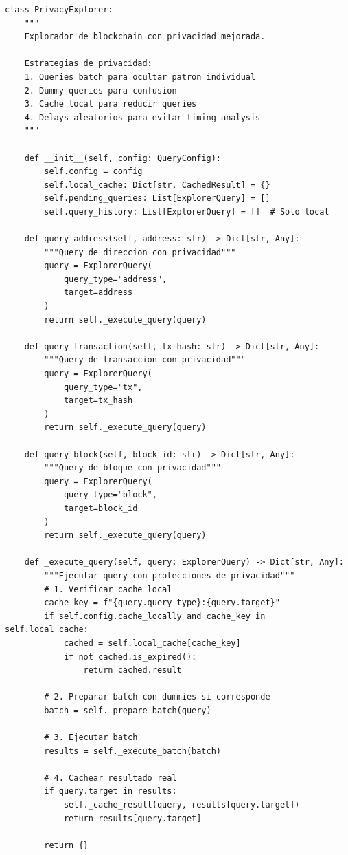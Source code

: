 \documentclass[11pt,a4paper,twoside]{book}
\theoremstyle{definition}
\theoremstyle{remark}
\begin{document}
\begin{lstlisting}[style=python, caption={Explorador de blockchain privacy-aware}]
class PrivacyExplorer:
    """
    Explorador de blockchain con privacidad mejorada.
    
    Estrategias de privacidad:
    1. Queries batch para ocultar patron individual
    2. Dummy queries para confusion
    3. Cache local para reducir queries
    4. Delays aleatorios para evitar timing analysis
    """
    
    def __init__(self, config: QueryConfig):
        self.config = config
        self.local_cache: Dict[str, CachedResult] = {}
        self.pending_queries: List[ExplorerQuery] = []
        self.query_history: List[ExplorerQuery] = []  # Solo local
        
    def query_address(self, address: str) -> Dict[str, Any]:
        """Query de direccion con privacidad"""
        query = ExplorerQuery(
            query_type="address",
            target=address
        )
        return self._execute_query(query)
    
    def query_transaction(self, tx_hash: str) -> Dict[str, Any]:
        """Query de transaccion con privacidad"""
        query = ExplorerQuery(
            query_type="tx",
            target=tx_hash
        )
        return self._execute_query(query)
    
    def query_block(self, block_id: str) -> Dict[str, Any]:
        """Query de bloque con privacidad"""
        query = ExplorerQuery(
            query_type="block",
            target=block_id
        )
        return self._execute_query(query)
    
    def _execute_query(self, query: ExplorerQuery) -> Dict[str, Any]:
        """Ejecutar query con protecciones de privacidad"""
        # 1. Verificar cache local
        cache_key = f"{query.query_type}:{query.target}"
        if self.config.cache_locally and cache_key in self.local_cache:
            cached = self.local_cache[cache_key]
            if not cached.is_expired():
                return cached.result
        
        # 2. Preparar batch con dummies si corresponde
        batch = self._prepare_batch(query)
        
        # 3. Ejecutar batch
        results = self._execute_batch(batch)
        
        # 4. Cachear resultado real
        if query.target in results:
            self._cache_result(query, results[query.target])
            return results[query.target]
        
        return {}
    

\end{lstlisting}
\end{document}
